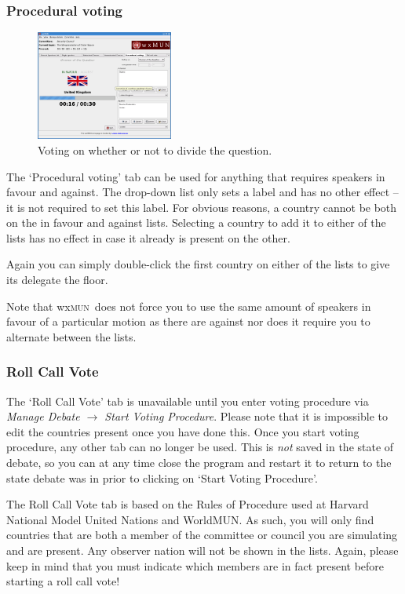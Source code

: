 \documentclass[11pt, a4paper]{article}
\newcommand\wxMUN{wx\textsc{mun}}
\begin{document}
\subsubsection{Procedural voting}
\begin{figure}
\includegraphics[width=0.4\textwidth]{screenshots/proc_voting.png}
\caption{Voting on whether or not to divide the question.}
\end{figure}

The `Procedural voting' tab can be used for anything that requires speakers in favour and against. The drop-down list only sets a label and has no other effect -- it is not required to set this label. For obvious reasons, a country cannot be both on the in favour and against lists. Selecting a country to add it to either of the lists has no effect in case it already is present on the other.

Again you can simply double-click the first country on either of the lists to give its delegate the floor. 

Note that \wxMUN\ does not force you to use the same amount of speakers in favour of a particular motion as there are against nor does it require you to alternate between the lists.

\subsubsection{Roll Call Vote}
The `Roll Call Vote' tab is unavailable until you enter voting procedure via \emph{Manage Debate $\rightarrow$ Start Voting Procedure}. Please note that it is impossible to edit the countries present once you have done this. Once you start voting procedure, any other tab can no longer be used. This is \emph{not} saved in the state of debate, so you can at any time close the program and restart it to return to the state debate was in prior to clicking on `Start Voting Procedure'.

The Roll Call Vote tab is based on the Rules of Procedure used at Harvard National Model United Nations and WorldMUN. As such, you will only find countries that are both a member of the committee or council you are simulating and are present. Any observer nation will not be shown in the lists. Again, please keep in mind that you must indicate which members are in fact present before starting a roll call vote!
\end{document}
